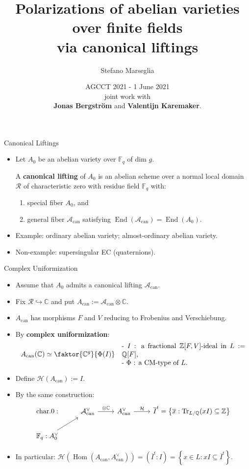 \documentclass[usenames,dvipsnames,handout]{beamer}
\title[]{Polarizations of abelian varieties over finite fields\\ via canonical liftings}
\subtitle{}
\author[Stefano Marseglia]{Stefano Marseglia\\}
\institute[]{Utrecht University}
\date[1 June 2021]{AGCCT 2021 - 1 June 2021\\ \pause joint work with\\ {\bf Jonas Bergstr\"om} and {\bf Valentijn Karemaker}.}
\def\Q{\mathbb{Q}}
\def\Z{\mathbb{Z}}
\def\C{\mathbb{C}}
\def\F{\mathbb{F}}
\DeclareMathOperator{\Hom}{Hom}
\DeclareMathOperator{\End}{End}
\DeclareMathOperator{\Tr}{Tr}
\newcommand{\cH}{{\mathcal H}}
\newcommand{\set}[1]{\left\lbrace#1\right\rbrace }
\newcommand{\Acan}{\mathcal{A}_{\mathrm{can}}}
\newcommand{\AcanC}{A_{\mathrm{can}}}
\begin{document}
\begin{frame}
\titlepage
\end{frame}

\begin{frame}{ Canonical Liftings } 
    \begin{itemize}
    \item Let $A_0$ be an abelian variety over $\F_q$ of dim $g$.
\pause
    \begin{definition}
	    A {\bf canonical lifting} of $A_0$ is an abelian scheme over a normal local domain $\mathcal{R}$ of characteristic zero with residue field $\F_q$ with:
	    \begin{enumerate}
	    \item special fiber $A_0$, and
	    \item general fiber $\Acan$ satisfying $\End(\Acan)= \End(A_0)$.
	    \end{enumerate}
    \end{definition}
\pause    
    \item Example: ordinary abelian variety; almost-ordinary abelian variety. 
\pause
    \item Non-example: supersingular EC (quaternions).
	\end{itemize}
\end{frame}

\begin{frame}{ Complex Uniformization }
    \begin{itemize}
    \item Assume that $A_0$ admits a canonical lifting $\Acan$.
\pause   
    \item Fix $\mathcal{R} \hookrightarrow \C$ and put $\AcanC:=\Acan \otimes \C$.
\pause
    \item $\AcanC$ has morphisms $F$ and $V$ reducing to Frobenius and Verschiebung.
\pause
    \item By {\bf complex uniformization}:
    \[ \AcanC(\C) \simeq \faktor{\C^g}{\Phi(I)} \quad 
    \parbox{18em}{ - $I$ : a fractional $\Z[F,V]$-ideal in $L:=\Q[F]$,  \\
                  - $\Phi$ : a CM-type of $L$. } \]
\pause
    \item Define $\cH(\AcanC):=I$.
\pause
    \item By the same construction:
    \[
    \begin{tikzcd}[ampersand replacement=\&] %
    \text{char.}0 : \& \Acan^\vee \arrow[r, "\otimes \C"] \& \AcanC^\vee \arrow[r, "\mathcal{H}"] \& \overline{I}^t =\set{ \overline{x} : \Tr_{L/\Q}(xI)\subseteq \Z }\\
    \F_q : A_0^\vee \arrow[ur] \& \& \&
    \end{tikzcd}    
    \]
\pause
    \item In particular: $\cH(\Hom(\AcanC,\AcanC^\vee)) = (\overline{I}^t:I) = \set{ x \in L : xI \subseteq \overline{I}^t }$.
	\end{itemize}
\end{frame}
\end{document}
